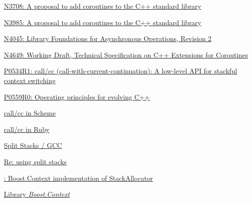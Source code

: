 \newpage
{}
\begin{thebibliography}{99}

        \href{http://www.open-std.org/jtc1/sc22/wg21/docs/papers/2013/n3708.pdf}
        {N3708: A proposal to add coroutines to the C++ standard library}

        \href{http://www.open-std.org/jtc1/sc22/wg21/docs/papers/2013/n3985.pdf}
        {N3985: A proposal to add coroutines to the C++ standard library}

        \href{http://www.open-std.org/jtc1/sc22/wg21/docs/papers/2014/n4045.pdf}
        {N4045: Library Foundations for Asynchronous Operations, Revision 2}

        \href{http://www.open-std.org/jtc1/sc22/wg21/docs/papers/2017/n4649.pdf}
        {N4649: Working Draft, Technical Specification on C++ Extensions for Coroutines}

        \href{http://www.open-std.org/jtc1/sc22/wg21/docs/papers/2017/p0534r1.pdf}
        {P0534R1: call/cc (call-with-current-continuation): A low-level API for stackful
        context switching}

        \href{http://www.open-std.org/jtc1/sc22/wg21/docs/papers/2017/p0559r0.pdf}
        {P0559R0: Operating principles for evolving C++}

        \href{http://community.schemewiki.org/?call-with-current-continuation}
        {call/cc in Scheme}

        \href{http://gnuu.org/2009/03/21/demystifying-continuations-in-ruby}
        {call/cc in Ruby}

        \href{http://gcc.gnu.org/wiki/SplitStacks}
        {Split Stacks / GCC}

        \href{https://gcc.gnu.org/ml/gcc-help/2012-03/msg00395.html}
        {Re: using split stacks}

        \href{https://github.com/boostorg/context/blob/master/include/boost/context/posix/segmented_stack.hpp}
        {: Boost.Context implementation
        of  StackAllocator}

        \href{http://www.boost.org/doc/libs/release/libs/context/doc/html/index.html}
        {Library \emph{Boost.Context}}


\end{thebibliography}
